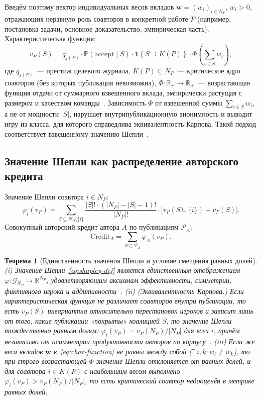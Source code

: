 \documentclass[12pt,a4paper]{article}
\newtheorem{theorem}{Теорема}
\theoremstyle{definition}
\newcommand{\R}{\mathbb{R}}
\renewcommand{\Pr}{\mathbb{P}}
\newcommand{\ind}[1]{\mathbf{1}\!\left\{#1\right\}}
\begin{document}
Введём поэтому вектор индивидуальных весов вкладов $\bm{w} = (w_i)_{i
\in N_P}$, $w_i > 0$, отражающих неравную роль соавторов в конкретной
работе $P$ (например, постановка задачи, основное доказательство,
эмпирическая часть). Характеристическая функция:
\begin{equation}
  v_P(S) = q_{j(P)} \cdot \Pr(\mathrm{accept} \mid S) \cdot \ind{S
  \supseteq K(P)} \cdot \Phi\!\left(\textstyle\sum_{i \in S} w_i\right),
  \label{eq:char-function}
\end{equation}
где $q_{j(P)}$~--- престиж целевого журнала, $K(P) \subseteq N_P$~---
критическое ядро соавторов (без которых публикация невозможна),
$\Phi\colon \R_+ \to \R_+$~--- возрастающая функция отдачи от
суммарного взвешенного вклада, эмпирически растущая с размером и
качеством команды~\citep{wuchty2007}. Зависимость $\Phi$ от
взвешенной суммы $\sum_{i \in S} w_i$, а не от мощности $|S|$,
нарушает внутрипубликационную анонимность и выводит игру из класса,
для которого справедлива эквивалентность Карпова. Такой подход
соответствует взвешенному значению Шепли~\citep{monderer1992}.

\subsection{Значение Шепли как распределение авторского кредита}

Значение Шепли соавтора $i \in N_P$:
\begin{equation}
  \varphi_i(v_P) = \sum_{S \subseteq N_P \setminus \{i\}} \frac{|S|!
  \cdot (|N_P| - |S| - 1)!}{|N_P|!} \cdot \bigl[v_P(S \cup \{i\}) -
  v_P(S)\bigr].
  \label{eq:shapley-def}
\end{equation}
Совокупный авторский кредит автора $A$ по публикациям $\mathcal{P}_A$:
\begin{equation}
  \mathrm{Credit}_A = \sum_{P \in \mathcal{P}_A} \varphi_A(v_P).
  \label{eq:credit}
\end{equation}

\begin{theorem}[Единственность значения Шепли и условие смещения равных долей]
  \label{thm:shapley}
  \textup{(i)} Значение Шепли~\eqref{eq:shapley-def} является
  единственным отображением $\varphi\colon \mathcal{G}_{N_P} \to
  \R^{N_P}$, удовлетворяющим аксиомам эффективности, симметрии,
  фиктивного игрока и аддитивности~\citep{shapley1953}. \textup{(ii)}
  \textup{(Эквивалентность Карпова.)} Если характеристическая функция
  не различает соавторов внутри публикации, то есть $v_P(S)$
  инвариантна относительно перестановок игроков и зависит лишь от
  того, какие публикации «покрыты» коалицией $S$, то значение Шепли
  тождественно равным долям: $\varphi_i(v_P) = v_P(N_P)/|N_P|$ для
  всех $i$, причём \emph{независимо} от асимметрии продуктивности
  авторов по корпусу~\citep{karpov2014}. \textup{(iii)} Если же веса
  вкладов $\bm{w}$ в~\eqref{eq:char-function} не равны между собой
  ($\exists\, i, k\colon w_i \neq w_k$), то при строго возрастающей
  $\Phi$ значение Шепли отклоняется от равных долей, и для соавтора
  $i \in K(P)$ с наибольшим весом выполнено $\varphi_i(v_P) >
  v_P(N_P)/|N_P|$, то есть критический соавтор недооценён в метрике
  равных долей.
\end{theorem}
\end{document}
